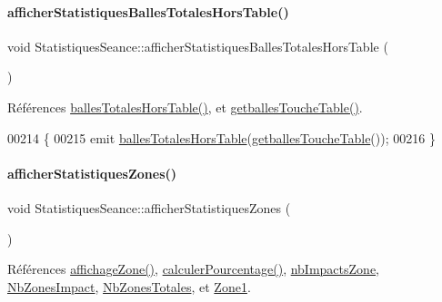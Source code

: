 \paragraph{\texorpdfstring{afficher\+Statistiques\+Balles\+Totales\+Hors\+Table()}{afficherStatistiquesBallesTotalesHorsTable()}}
{\footnotesize\ttfamily void Statistiques\+Seance\+::afficher\+Statistiques\+Balles\+Totales\+Hors\+Table (\begin{DoxyParamCaption}{ }\end{DoxyParamCaption})}



Références \hyperlink{class_statistiques_seance_a02a327f2a69eed4208b7b2076c6a67f2}{balles\+Totales\+Hors\+Table()}, et \hyperlink{class_statistiques_seance_a1f956e08733a81d0a86673cae6bc7feb}{getballes\+Touche\+Table()}.


\begin{DoxyCode}
00214 \{
00215     emit \hyperlink{class_statistiques_seance_a02a327f2a69eed4208b7b2076c6a67f2}{ballesTotalesHorsTable}(\hyperlink{class_statistiques_seance_a1f956e08733a81d0a86673cae6bc7feb}{getballesToucheTable}());
00216 \}
\end{DoxyCode}
\mbox{\label{class_statistiques_seance_afd9087c34222c0b2c0db11c5a96459c4}} 
\paragraph{\texorpdfstring{afficher\+Statistiques\+Zones()}{afficherStatistiquesZones()}}
{\footnotesize\ttfamily void Statistiques\+Seance\+::afficher\+Statistiques\+Zones (\begin{DoxyParamCaption}{ }\end{DoxyParamCaption})}



Références \hyperlink{class_statistiques_seance_a956ac10424a167d5b64fe13a92fbf121}{affichage\+Zone()}, \hyperlink{class_statistiques_seance_a67759edd6c296bd6b66f7860dbac130e}{calculer\+Pourcentage()}, \hyperlink{class_statistiques_seance_aa4a040cda282d5b1c250025f8e191e20}{nb\+Impacts\+Zone}, \hyperlink{class_statistiques_seance_aa839f5192cbadd7c3fb3651d62eff8b5a4623fc9051358f3d82fdccd5047d3736}{Nb\+Zones\+Impact}, \hyperlink{class_statistiques_seance_aa839f5192cbadd7c3fb3651d62eff8b5afe19f73563963b5160847cdd8c2260c4}{Nb\+Zones\+Totales}, et \hyperlink{class_statistiques_seance_aa839f5192cbadd7c3fb3651d62eff8b5a3aa1c8dd53092c489bf5b27952c898ac}{Zone1}.



